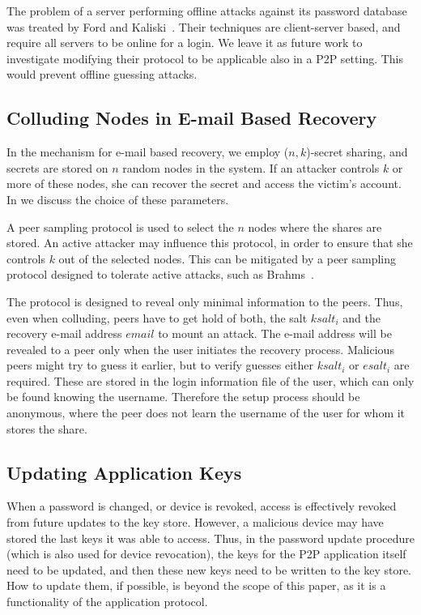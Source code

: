 The problem of a server performing offline attacks against its password
database was treated by Ford and Kaliski~\cite{FordK00}. Their techniques are
client-server based, and require all servers to be online for a login. We
leave it as future work to investigate modifying their protocol to be
applicable also in a P2P setting. This would prevent offline guessing attacks.

\subsection{Colluding Nodes in E-mail Based Recovery}

In the mechanism for e-mail based recovery, we employ ($n,k$)-secret sharing,
and secrets are stored on $n$ random nodes in the system. If
an attacker controls $k$ or more of these nodes, she can recover the secret
and access the victim's account. In  we discuss the choice
of these parameters.

A peer sampling protocol is used to select the $n$ nodes where the shares are
stored. An active attacker may influence this protocol, in order to
ensure that she controls $k$ out of the selected nodes. This can be
mitigated by a peer sampling protocol designed to tolerate active
attacks, such as Brahms~\cite{BortnikovGKKS09}.

The protocol is designed to reveal only minimal information to the 
peers.
Thus, even when colluding, peers have to get hold of both, the salt $ksalt_i$ 
and the recovery e-mail address $email$ to mount an attack. 
The e-mail address will be revealed to a peer only when the user initiates the 
recovery process. Malicious peers might try to guess it earlier, but to verify 
guesses either $ksalt_i$ or $esalt_i$ are required.
These are stored in the login information file of the user, which can only 
be found knowing the username. Therefore the setup process should be
anonymous, where the peer does not learn the username of the user for whom it
stores the share.


\subsection{Updating Application Keys} 

When a password is changed, or device is revoked, access is effectively
revoked from future updates to the key store. However, a malicious device may
have stored the last keys it was able to access.  Thus, in the password update
procedure (which is also used for device revocation), the keys for the P2P
application itself need to be updated, and then these new keys need to be
written to the key store. How to update them, if possible, is beyond the scope
of this paper, as it is a functionality of the application protocol.

